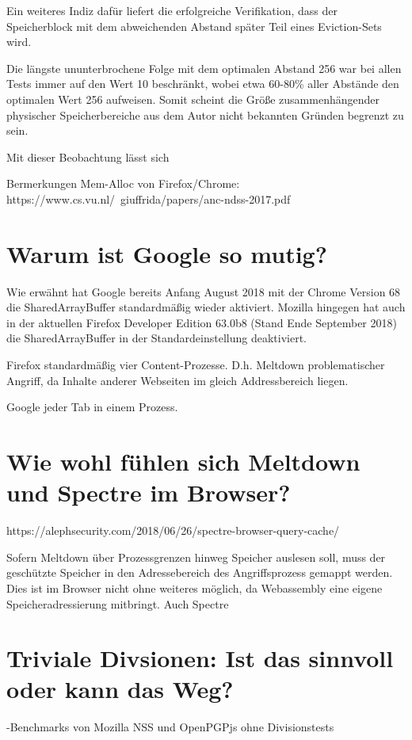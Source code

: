 Ein weiteres Indiz dafür liefert die erfolgreiche Verifikation, dass der Speicherblock mit dem abweichenden Abstand später Teil eines Eviction-Sets wird.

Die längste ununterbrochene Folge mit dem optimalen Abstand 256 war bei allen Tests immer auf den Wert 10 beschränkt, wobei etwa 60-80\% aller Abstände den optimalen Wert 256 aufweisen.
Somit scheint die Größe zusammenhängender physischer Speicherbereiche aus dem Autor nicht bekannten Gründen begrenzt zu sein.

Mit dieser Beobachtung lässt sich 

Bermerkungen Mem-Alloc von Firefox/Chrome: https://www.cs.vu.nl/~giuffrida/papers/anc-ndss-2017.pdf
\cite{ASLROnTheLine}

\section{Warum ist Google so mutig?}
\label{GooglePageIsolation}

Wie erwähnt hat Google bereits Anfang August 2018 mit der Chrome Version 68 \cite{ChromeSharedArrayBufferAgain} die SharedArrayBuffer standardmäßig wieder aktiviert.
Mozilla hingegen hat auch in der aktuellen Firefox Developer  Edition 63.0b8 (Stand Ende September 2018) die SharedArrayBuffer in der Standardeinstellung deaktiviert.

Firefox standardmäßig vier Content-Prozesse. D.h. Meltdown problematischer Angriff, da Inhalte anderer Webseiten im gleich Addressbereich liegen.

Google jeder Tab in einem Prozess. \cite{ChromeSiteIsolation}


\section{Wie wohl fühlen sich Meltdown und Spectre im Browser?}
\label{MeltdownSpectreBrowser}

https://alephsecurity.com/2018/06/26/spectre-browser-query-cache/
\cite{OvercomingSpectreBrowserMitigations}

Sofern Meltdown über Prozessgrenzen hinweg Speicher auslesen soll, muss der geschützte Speicher in den Adressebereich des Angriffsprozess gemappt werden.
Dies ist im Browser nicht ohne weiteres möglich, da Webassembly eine eigene Speicheradressierung mitbringt.
Auch Spectre

\section{Triviale Divsionen: Ist das sinnvoll oder kann das Weg?}

-Benchmarks von Mozilla NSS und OpenPGPjs ohne Divisionstests